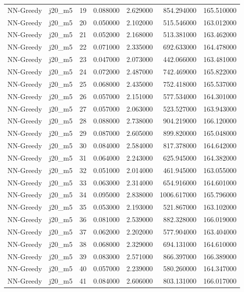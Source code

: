 \begin{tabular}{llrrrrr}
NN-Greedy & j20_m5 & 19 & 0.088000 & 2.629000 & 854.294000 & 165.510000 \\
NN-Greedy & j20_m5 & 20 & 0.050000 & 2.102000 & 515.546000 & 163.012000 \\
NN-Greedy & j20_m5 & 21 & 0.052000 & 2.168000 & 513.381000 & 163.462000 \\
NN-Greedy & j20_m5 & 22 & 0.071000 & 2.335000 & 692.633000 & 164.478000 \\
NN-Greedy & j20_m5 & 23 & 0.047000 & 2.073000 & 442.066000 & 163.481000 \\
NN-Greedy & j20_m5 & 24 & 0.072000 & 2.487000 & 742.469000 & 165.822000 \\
NN-Greedy & j20_m5 & 25 & 0.068000 & 2.435000 & 752.418000 & 165.537000 \\
NN-Greedy & j20_m5 & 26 & 0.057000 & 2.151000 & 577.534000 & 164.301000 \\
NN-Greedy & j20_m5 & 27 & 0.057000 & 2.063000 & 523.527000 & 163.943000 \\
NN-Greedy & j20_m5 & 28 & 0.088000 & 2.738000 & 904.219000 & 166.120000 \\
NN-Greedy & j20_m5 & 29 & 0.087000 & 2.605000 & 899.820000 & 165.048000 \\
NN-Greedy & j20_m5 & 30 & 0.084000 & 2.584000 & 817.378000 & 164.642000 \\
NN-Greedy & j20_m5 & 31 & 0.064000 & 2.243000 & 625.945000 & 164.382000 \\
NN-Greedy & j20_m5 & 32 & 0.051000 & 2.014000 & 461.945000 & 163.055000 \\
NN-Greedy & j20_m5 & 33 & 0.063000 & 2.314000 & 654.916000 & 164.601000 \\
NN-Greedy & j20_m5 & 34 & 0.095000 & 2.838000 & 1006.617000 & 165.796000 \\
NN-Greedy & j20_m5 & 35 & 0.053000 & 2.193000 & 521.867000 & 163.102000 \\
NN-Greedy & j20_m5 & 36 & 0.081000 & 2.539000 & 882.328000 & 166.019000 \\
NN-Greedy & j20_m5 & 37 & 0.062000 & 2.202000 & 577.904000 & 163.404000 \\
NN-Greedy & j20_m5 & 38 & 0.068000 & 2.329000 & 694.131000 & 164.610000 \\
NN-Greedy & j20_m5 & 39 & 0.083000 & 2.571000 & 866.397000 & 166.389000 \\
NN-Greedy & j20_m5 & 40 & 0.057000 & 2.239000 & 580.260000 & 164.347000 \\
NN-Greedy & j20_m5 & 41 & 0.084000 & 2.606000 & 803.131000 & 166.017000 \\

\end{tabular}
